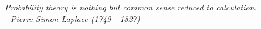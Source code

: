 \vspace*{2cm}
\fancyhf[rh]{}
\begin{center}
    \textit{Probability theory is nothing but common sense reduced to calculation. \\
    \vspace*{0.5cm}
    - Pierre-Simon Laplace (1749 - 1827)}
\end{center}